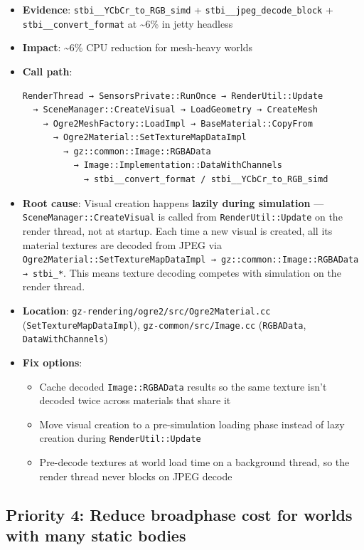\documentclass[11pt, a4paper]{article}
\providecommand{\tightlist}{%
  \setlength{\itemsep}{0pt}\setlength{\parskip}{0pt}}
\begin{document}
\begin{itemize}
\item
  \textbf{Evidence}: \texttt{stbi\_\_YCbCr\_to\_RGB\_simd} +
  \texttt{stbi\_\_jpeg\_decode\_block} +
  \texttt{stbi\_\_convert\_format} at \textasciitilde6\% in jetty
  headless
\item
  \textbf{Impact}: \textasciitilde6\% CPU reduction for mesh-heavy
  worlds
\item
  \textbf{Call path}:

\begin{verbatim}
RenderThread → SensorsPrivate::RunOnce → RenderUtil::Update
  → SceneManager::CreateVisual → LoadGeometry → CreateMesh
    → Ogre2MeshFactory::LoadImpl → BaseMaterial::CopyFrom
      → Ogre2Material::SetTextureMapDataImpl
        → gz::common::Image::RGBAData
          → Image::Implementation::DataWithChannels
            → stbi__convert_format / stbi__YCbCr_to_RGB_simd
\end{verbatim}
\item
  \textbf{Root cause}: Visual creation happens \textbf{lazily during
  simulation} --- \texttt{SceneManager::CreateVisual} is called from
  \texttt{RenderUtil::Update} on the render thread, not at startup. Each
  time a new visual is created, all its material textures are decoded
  from JPEG via
  \texttt{Ogre2Material::SetTextureMapDataImpl\ →\ gz::common::Image::RGBAData\ →\ stbi\_*}.
  This means texture decoding competes with simulation on the render
  thread.
\item
  \textbf{Location}: \texttt{gz-rendering/ogre2/src/Ogre2Material.cc}
  (\texttt{SetTextureMapDataImpl}), \texttt{gz-common/src/Image.cc}
  (\texttt{RGBAData}, \texttt{DataWithChannels})
\item
  \textbf{Fix options}:

  \begin{itemize}
  \tightlist
  \item
    Cache decoded \texttt{Image::RGBAData} results so the same texture
    isn't decoded twice across materials that share it
  \item
    Move visual creation to a pre-simulation loading phase instead of
    lazy creation during \texttt{RenderUtil::Update}
  \item
    Pre-decode textures at world load time on a background thread, so
    the render thread never blocks on JPEG decode
  \end{itemize}
\end{itemize}

\hypertarget{priority-2-reduce-broadphase-cost-for-worlds-with-many-static-bodies}{%
\subsection{Priority 4: Reduce broadphase cost for worlds with many
static
bodies}\label{priority-2-reduce-broadphase-cost-for-worlds-with-many-static-bodies}}
\end{document}
